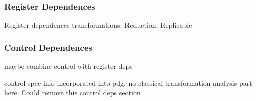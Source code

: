


%
%
%


\subsubsection{Register Dependences}

Register dependences transformations:
Reduction,
Replicable

\subsubsection{Control Dependences}

maybe combine control with register deps

control spec info incorporated into pdg. no classical transformation analysis
part here. Could remove this control deps section


